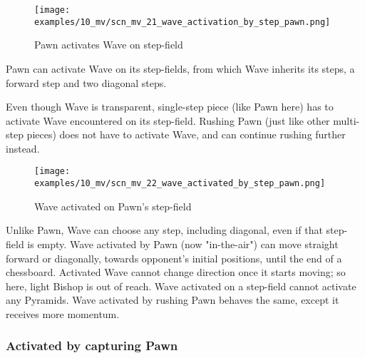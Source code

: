 \vspace*{-1.5\baselineskip}
\noindent
\begin{figure}[!h]
\texttt{[image: examples/10\_mv/scn\_mv\_21\_wave\_activation\_by\_step\_pawn.png]}
\vspace*{-1.4\baselineskip}
\caption{Pawn activates Wave on step-field}
\label{fig:scn_mv_21_wave_activation_by_step_pawn}
\end{figure}

\vspace*{-0.5\baselineskip}
Pawn can activate Wave on its step-fields, from which Wave inherits its steps, a
forward step and two diagonal steps.

Even though Wave is transparent, single-step piece (like Pawn here) has to activate
Wave encountered on its step-field. Rushing Pawn (just like other multi-step pieces)
does not have to activate Wave, and can continue rushing further instead.

\clearpage %

\vspace*{-2.1\baselineskip}
\noindent
\begin{figure}[!h]
\texttt{[image: examples/10\_mv/scn\_mv\_22\_wave\_activated\_by\_step\_pawn.png]}
\vspace*{-1.4\baselineskip}
\caption{Wave activated on Pawn's step-field}
\label{fig:scn_mv_22_wave_activated_by_step_pawn}
\end{figure}

\vspace*{-0.5\baselineskip}
Unlike Pawn, Wave can choose any step, including diagonal, even if that step-field
is empty. Wave activated by Pawn (now "in-the-air") can move straight forward or
diagonally, towards opponent's initial positions, until the end of a chessboard.
Activated Wave cannot change direction once it starts moving; so here, light Bishop
is out of reach. Wave activated on a step-field cannot activate any Pyramids.\newline
\indent
Wave activated by rushing Pawn behaves the same, except it receives more momentum.

\clearpage %

\subsubsection*{Activated by capturing Pawn}
\label{sec:Miranda's veil/Wave/Movement/Activated by capturing Pawn}

